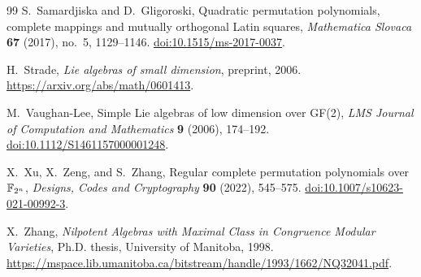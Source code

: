 \begin{thebibliography}{99}
S.~Samardjiska and D.~Gligoroski,
Quadratic permutation polynomials, complete mappings and mutually orthogonal
Latin squares,
\emph{Mathematica Slovaca} \textbf{67} (2017), no.~5, 1129--1146.
\href{https://doi.org/10.1515/ms-2017-0037}{doi:10.1515/ms-2017-0037}.

H.~Strade,
\emph{Lie algebras of small dimension}, preprint, 2006.
\url{https://arxiv.org/abs/math/0601413}.

M.~Vaughan-Lee,
Simple Lie algebras of low dimension over GF(2),
\emph{LMS Journal of Computation and Mathematics}
\textbf{9} (2006), 174--192.
\href{https://doi.org/10.1112/S1461157000001248}{doi:10.1112/S1461157000001248}.

X.~Xu, X.~Zeng, and S.~Zhang,
Regular complete permutation polynomials over \(\mathbb F_{2^n}\),
\emph{Designs, Codes and Cryptography} \textbf{90} (2022), 545--575.
\href{https://doi.org/10.1007/s10623-021-00992-3}{doi:10.1007/s10623-021-00992-3}.

X.~Zhang,
\emph{Nilpotent Algebras with Maximal Class in Congruence Modular Varieties},
Ph.D. thesis, University of Manitoba, 1998.
\url{https://mspace.lib.umanitoba.ca/bitstream/handle/1993/1662/NQ32041.pdf}.

\end{thebibliography}
